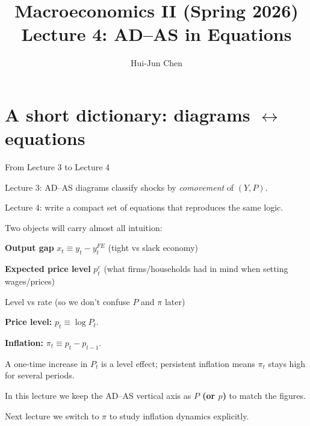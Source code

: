 \documentclass[aspectratio=169,xcolor=dvipsnames]{beamer}
\title[AD--AS (Math)]{Macroeconomics II (Spring 2026)\\\vspace{4pt}Lecture 4: AD--AS in Equations}
\author[Hui-Jun Chen]{Hui-Jun Chen}
\institute[]{National Tsing Hua University}
\date{}
\let\tempone\itemize
\let\temptwo\enditemize
\renewenvironment{itemize}{\tempone\addtolength{\itemsep}{\fill}}{\temptwo}
\begin{document}
\begin{frame}
    \titlepage
\end{frame}

\section[Diagram]{A short dictionary: diagrams $\leftrightarrow$ equations}

\begin{frame}{From Lecture 3 to Lecture 4}
\begin{itemize}
\item Lecture 3: AD--AS diagrams classify shocks by \emph{comovement} of $(Y,P)$.
\item Lecture 4: write a compact set of equations that reproduces the same logic.
\item Two objects will carry almost all intuition:
\begin{itemize}
\item \textbf{Output gap} $x_t \equiv y_t - y_t^{FE}$ (tight vs slack economy)
\item \textbf{Expected price level} $p_t^e$ (what firms/households had in mind when setting wages/prices)
\end{itemize}
\end{itemize}
\end{frame}

\begin{frame}{Level vs rate (so we don't confuse $P$ and $\pi$ later)}
\begin{itemize}
\item \textbf{Price level:} $p_t \equiv \log P_t$.
\item \textbf{Inflation:} $\pi_t \equiv p_t - p_{t-1}$.
\item A one-time increase in $P_t$ is a level effect; persistent inflation means $\pi_t$ stays high for several periods.
\end{itemize}

\vspace{0.2em}
\begin{itemize}
\item In this lecture we keep the AD--AS vertical axis as \textbf{$P$ (or $p$)} to match the figures.
\item Next lecture we switch to \textbf{$\pi$} to study inflation dynamics explicitly.
\end{itemize}
\end{frame}
\end{document}
